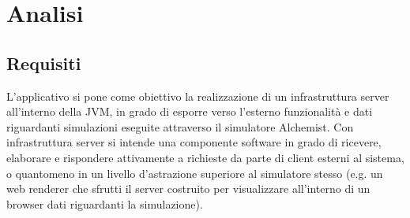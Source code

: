 \chapter{Analisi}\label{cap:analysis}
\section{Requisiti}\label{sec:requirements}
L'applicativo si pone come obiettivo la realizzazione di un infrastruttura server all'interno della \ac{JVM}, in grado
di esporre verso l'esterno funzionalità e dati riguardanti simulazioni eseguite attraverso il simulatore Alchemist.
Con infrastruttura server si intende una componente software in grado di ricevere, elaborare e rispondere attivamente a richieste da parte
di client esterni al sistema, o quantomeno in un livello d'astrazione superiore al simulatore stesso (e.g. un web renderer che sfrutti il
server costruito per visualizzare all'interno di un browser dati riguardanti la simulazione).

